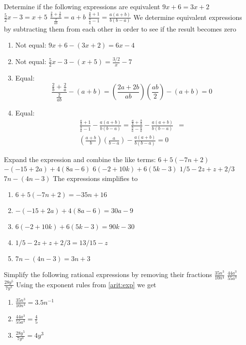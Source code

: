 \begin{ExerciseList}
\Exercise Determine if the following expressions are equivalent
\Question $9x+6 = 3x+2$
\Question $\frac{5}{2}x - 3 = x+5$
\Question $\frac{\frac{2}{b} + \frac{2}{a}}{\frac{2}{ab}} = a+b$
\Question $\frac{\frac{a}{b} + 1}{\frac{b}{a} - 1} = \frac{a(a+b)}{b(b-a)}$
\Answer We determine equivalent expressions by subtracting them from each
other in order to see if the result becomes zero
\begin{enumerate}
\item \myindent Not equal: $9x + 6 - (3x+2) = 6x - 4$
\item \myindent Not equal: $\frac{5}{2}x - 3 - (x + 5) = \frac{3/2}x - 7$
\item \myindent Equal:
\[
\frac{\frac{2}{b} + \frac{2}{a}}{\frac{2}{ab}} - (a + b) =
\left(\frac{2a + 2b}{ab}\right)\left(\frac{ab}{2}\right) - (a + b) = 0
\]
\item \myindent Equal:
\begin{align*}
\frac{\frac{a}{b}+1}{\frac{b}{a}-1} - \frac{a(a+b)}{b(b-a)} =
\frac{\frac{a}{b} + \frac{b}{b}}{\frac{b}{a} - \frac{a}{a}} - \frac{a(a+b)}{b(b-a)} &= \\
\left(\frac{a + b}{b}\right)\left(\frac{a}{b-a}\right) - \frac{a(a+b)}{b(b-a)} = 0
\end{align*}
\end{enumerate}

\Exercise Expand the expression and combine the like terms:
\Question $6+5(−7n+2)$
\Question $−(−15+2a)+4(8a−6)$
\Question $6(−2+10k)+6(5k−3)$
\Question $1/5 - 2z + z + 2/3$
\Question $7n - (4n - 3)$
\Answer The expressions simplifies to
\begin{enumerate}
\item \myindent $6+5(-7n+2) = -35n + 16$
\item \myindent $-(-15+2a)+4(8a-6) = 30a - 9$
\item \myindent $6(-2+10k)+6(5k-3) = 90k - 30$
\item \myindent $1/5 - 2z + z + 2/3 = 13/15 - z$
\item \myindent $7n - (4n - 3) = 3n + 3$
\end{enumerate}

\Exercise Simplify the following rational expressions by removing their
fractions
\Question $\frac{35n^3}{10n^4}$
\Question $\frac{44a^3}{55a^3}$
\Question $\frac{28y^5}{7y^3}$
\Answer Using the exponent rules from \ref{arit:exp} we get
\begin{enumerate}
\item \myindent $\frac{35n^3}{10n^4} = 3.5n^{-1}$
\item \myindent $\frac{44a^3}{55a^3} = \frac{4}{5}$
\item \myindent $\frac{28y^5}{7y^3} = 4y^3$
\end{enumerate}


\end{ExerciseList}

